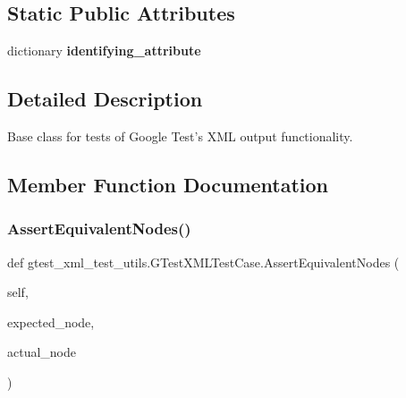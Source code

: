 \subsection*{Static Public Attributes}
\begin{DoxyCompactItemize}
\item 
dictionary {\bfseries identifying\+\_\+attribute}
\end{DoxyCompactItemize}


\subsection{Detailed Description}
\begin{DoxyVerb}Base class for tests of Google Test's XML output functionality.
\end{DoxyVerb}
 

\subsection{Member Function Documentation}
\mbox{\label{classgtest__xml__test__utils_1_1_g_test_x_m_l_test_case_a977273e8863f4f41d121bb5a64b08d32}} 
\subsubsection{\texorpdfstring{Assert\+Equivalent\+Nodes()}{AssertEquivalentNodes()}}
{\footnotesize\ttfamily def gtest\+\_\+xml\+\_\+test\+\_\+utils.\+G\+Test\+X\+M\+L\+Test\+Case.\+Assert\+Equivalent\+Nodes (\begin{DoxyParamCaption}\item[{}]{self,  }\item[{}]{expected\+\_\+node,  }\item[{}]{actual\+\_\+node }\end{DoxyParamCaption})}

